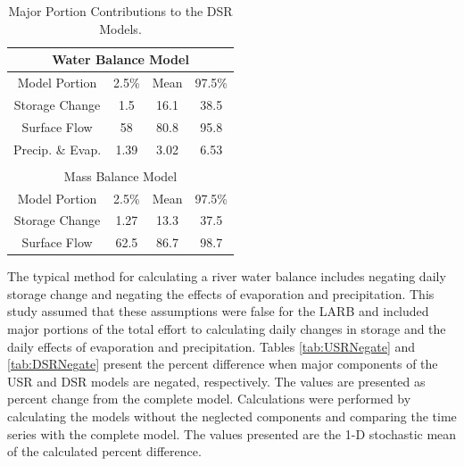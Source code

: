 \begin{linenumbers}
\begin{table}[htbp]
\centering
\caption[Major Portion Contributions to the DSR Models.]{Major Portion Contributions to the DSR Models.}
\label{tab:DSRImpact}
\begin{tabular}{c|ccc}
	\multicolumn{4}{c}{Water Balance Model} \\
	\toprule
	Model Portion	& 2.5\% & Mean & 97.5\% \\
	\midrule
	\midrule
	Storage Change		& 1.5	&16.1	&38.5\\
	Surface Flow		& 58	&80.8	&95.8\\
	Precip. \& Evap. 	& 1.39	&3.02	&6.53\\
	\bottomrule
	\multicolumn{4}{c}{} \\
	\multicolumn{4}{c}{Mass Balance Model} \\
	\toprule
	Model Portion	& 2.5\% & Mean & 97.5\% \\
	\midrule
	\midrule
	Storage Change		& 1.27	&13.3	&37.5\\
	Surface Flow		& 62.5	&86.7	&98.7\\
	\bottomrule
\end{tabular}
\end{table}
\clearpage

The typical method for calculating a river water balance includes negating daily storage change and negating the effects of evaporation and precipitation.  This study assumed that these assumptions were false for the LARB and included major portions of the total effort to calculating daily changes in storage and the daily effects of evaporation and precipitation.  Tables \ref{tab:USRNegate} and \ref{tab:DSRNegate} present the percent difference when major components of the USR and DSR models are negated, respectively.  The values are presented as percent change from the complete model.  Calculations were performed by calculating the models without the neglected components and comparing the time series with the complete model.  The values presented are the 1-D stochastic mean of the calculated percent difference.


\end{linenumbers}
